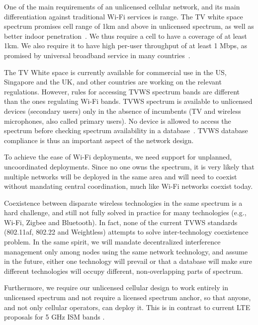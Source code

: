  One of the main requirements of an unlicensed cellular network, and its main differentiation against traditional Wi-Fi services is range. 
The TV white space spectrum promises cell range of 1km and above in unlicensed spectrum, as well as better indoor penetration~\cite{Rice_af}. 
We thus require a cell to have a coverage of at least 1km. 
We also require it to have high per-user throughput of at least 1 Mbps, as promised by universal broadband service in many countries~\cite{uni_broadband}.  

The TV White space is currently available for commercial use in the US, Singapore and the UK, and other countries are working on the relevant regulations. 
However, rules for accessing TVWS spectrum bands are different than the ones regulating Wi-Fi bands. 
TVWS spectrum is available to unlicensed devices (secondary users) only in the absence of incumbents (TV and wireless microphones, also called primary users). 
No device is allowed to access the spectrum before checking spectrum availability in a database~\cite{Rice_af}. 
TVWS database compliance is thus an important aspect of the network design.

To achieve the ease of Wi-Fi deployments, we need support for unplanned, uncoordinated deployments. Since no one owns the spectrum, it is very likely 
that multiple networks will be deployed in the same area and will need to coexist without mandating central coordination, much like Wi-Fi networks coexist today. 

Coexistence between disparate wireless technologies in the same spectrum is a hard challenge, and still not fully solved in practice for many technologies (e.g., Wi-Fi, Zigbee and Bluetooth). In fact, none of the current TVWS standards (802.11af, 802.22 and Weightless) attempts to solve inter-technology coexistence problem. 
In the same spirit, we will mandate decentralized interference management only among nodes using the same network technology, and assume in the future, either one technology will prevail or that a database will make sure different technologies will occupy different, non-overlapping parts of spectrum. 



Furthermore, we require our unlicensed cellular design to work entirely in unlicensed spectrum and not require a licensed spectrum anchor, so that anyone, and not only cellular operators, can deploy it. This is in contrast to current LTE proposals for 5 GHz ISM bands \cite{lteuforum_lteu, jian2015coexistence, radisys-lte}. 

